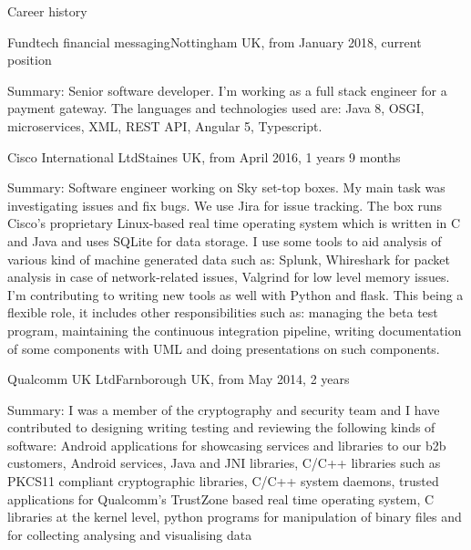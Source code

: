 \documentclass{resume}
\begin{document}
  \begin{rSection}{Career history}
     
    \begin{rSubsection}{Fundtech financial messaging}{Nottingham UK, from January 2018, current position}{}{}
    \item[Summary:]
      Senior software developer. I'm working as a full stack engineer for a payment gateway. The languages and technologies used are: Java 8, OSGI, microservices, XML, REST API, Angular 5, Typescript.
    \end{rSubsection}

   
    \begin{rSubsection}{Cisco International Ltd}{Staines UK, from April 2016, 1 years 9 months}{}{}
    \item[Summary:]
      Software engineer working on Sky set-top boxes.
      My main task was investigating issues and fix bugs. 
      We use Jira for issue tracking. 
      The box runs Cisco's proprietary Linux-based real time operating system which is written in C and Java and uses SQLite for data storage.
      I use some tools to aid analysis of various kind of machine generated data such as: Splunk, Whireshark for packet analysis in case of network-related issues, Valgrind for low level memory issues.
      I'm contributing to writing new tools as well with Python and flask.
      This being a flexible role, it includes other responsibilities such as: managing the beta test program, maintaining the continuous integration pipeline, writing documentation of some components with UML and doing presentations on such components.
    \end{rSubsection}

    \begin{rSubsection}{Qualcomm UK Ltd}{Farnborough UK, from May 2014, 2 years}{}{}
	\item[Summary:]
	  I was a member of the cryptography and security team and I have contributed to designing writing testing and reviewing the following kinds of software:
	  Android applications for showcasing services and libraries to our b2b customers,
	  Android services, 
	  Java and JNI libraries, 
	  C/C++ libraries such as PKCS11 compliant cryptographic libraries,
	  C/C++ system daemons,
	  trusted applications for Qualcomm's TrustZone based real time operating system,
	  C libraries at the kernel level,
	  python programs for manipulation of binary files and for collecting analysing and visualising data


\end{rSubsection}
\end{rSection}
\end{document}

